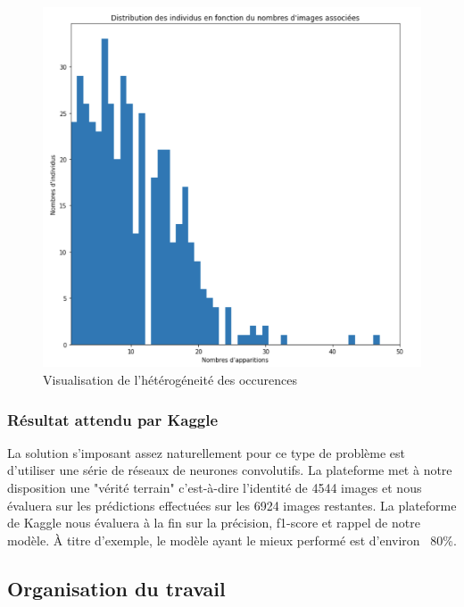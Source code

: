 \documentclass[12pt,a4paper]{report}
\begin{document}
\begin{spacing}{1.5}
\begin{figure}[H]
\begin{center}
\includegraphics[scale=0.55]{figures/histo_appearance.png}
\caption{Visualisation de l'hétérogéneité des occurences}
\end{center}
\end{figure}




\subsubsection{Résultat attendu par Kaggle}
La solution s’imposant assez naturellement pour ce type de problème est d’utiliser une série de réseaux de neurones convolutifs.
La plateforme met à notre disposition une "vérité terrain" c’est-à-dire l'identité de 4544 images et nous évaluera sur les prédictions effectuées sur les 6924 images restantes.
La plateforme de Kaggle nous évaluera à la fin sur la précision, f1-score et rappel de notre modèle. À titre d’exemple, le modèle ayant le mieux performé est d'environ  80\%\cite{bogucki2019applying}.



\subsection{Organisation du travail} 


\end{spacing}
\end{document}
